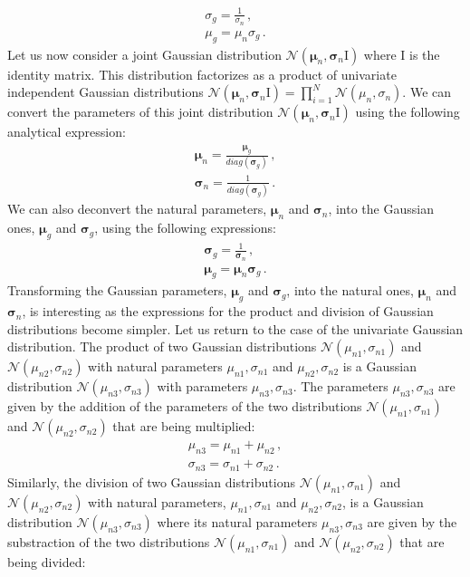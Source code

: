 \begin{align}
\sigma_g = \frac{1}{\sigma_n} \,, \\
\mu_g = \mu_n \sigma_g \,.
\end{align}
Let us now consider a joint Gaussian distribution $\mathcal{N}(\boldsymbol{\mu}_n, \boldsymbol{\sigma}_n \text{I})$ where $\text{I}$ is the identity matrix. This distribution factorizes as a product of univariate independent Gaussian distributions $\mathcal{N}(\boldsymbol{\mu}_n, \boldsymbol{\sigma}_n \text{I}) = \prod_{i=1}^{N} \mathcal{N}(\mu_n, \sigma_n)$.  We can convert the parameters of this joint distribution $\mathcal{N}(\boldsymbol{\mu}_n, \boldsymbol{\sigma}_n \text{I})$ using the following analytical expression:
\begin{align}
\boldsymbol{\mu}_n = \frac{\boldsymbol{\mu}_g}{diag(\boldsymbol{\sigma}_g)} \,, \\
\boldsymbol{\sigma}_n = \frac{1}{diag(\boldsymbol{\sigma}_g)}\,.
\end{align}
We can also deconvert the natural parameters, $\boldsymbol{\mu}_n$ and $\boldsymbol{\sigma}_n$, into the Gaussian ones, $\boldsymbol{\mu}_g$ and $\boldsymbol{\sigma}_g$, using the following expressions:
\begin{align}
\boldsymbol{\sigma}_g = \frac{1}{\boldsymbol{\sigma}_n} \,, \\
\boldsymbol{\mu}_g = \boldsymbol{\mu}_n \boldsymbol{\sigma}_g \,.
\end{align}
Transforming the Gaussian parameters, $\boldsymbol{\mu}_g$ and $\boldsymbol{\sigma}_g$, into the natural ones, $\boldsymbol{\mu}_n$ and $\boldsymbol{\sigma}_n$, is interesting as the expressions for the product and division of Gaussian distributions become simpler. Let us return to the case of the univariate Gaussian distribution. The product of two Gaussian distributions $\mathcal{N}(\mu_{n1}, \sigma_{n1})$ and $\mathcal{N}(\mu_{n2}, \sigma_{n2})$ with natural parameters $\mu_{n1}, \sigma_{n1}$ and $\mu_{n2}, \sigma_{n2}$ is a Gaussian distribution $\mathcal{N}(\mu_{n3}, \sigma_{n3})$ with parameters $\mu_{n3}, \sigma_{n3}$. The parameters $\mu_{n3}, \sigma_{n3}$ are given by the addition of the parameters of the two distributions $\mathcal{N}(\mu_{n1}, \sigma_{n1})$ and $\mathcal{N}(\mu_{n2}, \sigma_{n2})$ that are being multiplied:
\begin{align}
\mu_{n3} = \mu_{n1} + \mu_{n2} \,, \\
\sigma_{n3} = \sigma_{n1} + \sigma_{n2} \,.
\end{align}
Similarly, the division of two Gaussian distributions $\mathcal{N}(\mu_{n1}, \sigma_{n1})$ and $\mathcal{N}(\mu_{n2}, \sigma_{n2})$ with natural parameters, $\mu_{n1}, \sigma_{n1}$ and $\mu_{n2}, \sigma_{n2}$, is a Gaussian distribution $\mathcal{N}(\mu_{n3}, \sigma_{n3})$ where its natural parameters $\mu_{n3}, \sigma_{n3}$ are given by the substraction of the two distributions $\mathcal{N}(\mu_{n1}, \sigma_{n1})$ and $\mathcal{N}(\mu_{n2}, \sigma_{n2})$ that are being divided:
